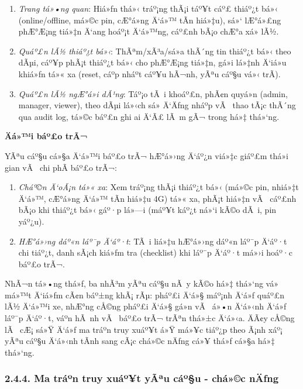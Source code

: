 \documentclass[a4paper]{extarticle}
\providecommand{\tightlist}{%
  \setlength{\itemsep}{0pt}\setlength{\parskip}{0pt}}
\begin{document}
\begin{enumerate}
\def\labelenumi{\arabic{enumi}.}
\tightlist
\item
  \emph{Trang tá»•ng quan}: Hiá»ƒn thá»‹ tráº¡ng thÃ¡i táº¥t cáº£ thiáº¿t bá»‹
  (online/offline, má»©c pin, cÆ°á»ng Ä‘á»™ tÃ­n hiá»‡u), sá»‘ lÆ°á»£ng phÆ°Æ¡ng tiá»‡n
  Ä‘ang hoáº¡t Ä‘á»™ng, cáº£nh bÃ¡o chÆ°a xá»­ lÃ½.
\item
  \emph{Quáº£n lÃ½ thiáº¿t bá»‹}: ThÃªm/xÃ³a/sá»­a thÃ´ng tin thiáº¿t bá»‹ theo dÃµi, cáº¥p
  phÃ¡t thiáº¿t bá»‹ cho phÆ°Æ¡ng tiá»‡n, gá»­i lá»‡nh Ä‘iá»u khiá»ƒn tá»« xa (reset, cáº­p
  nháº­t cáº¥u hÃ¬nh, yÃªu cáº§u vá»‹ trÃ­).
\item
  \emph{Quáº£n lÃ½ ngÆ°á»i dÃ¹ng}: Táº¡o tÃ i khoáº£n, phÃ¢n quyá»n (admin, manager,
  viewer), theo dÃµi lá»‹ch sá»­ Ä‘Äƒng nháº­p vÃ  thao tÃ¡c thÃ´ng qua audit log,
  tá»©c báº£n ghi ai Ä‘Ã£ lÃ m gÃ¬ trong há»‡ thá»‘ng.
\end{enumerate}

\textbf{Äá»™i báº£o trÃ¬}

YÃªu cáº§u cá»§a Ä‘á»™i báº£o trÃ¬ hÆ°á»›ng Ä‘áº¿n viá»‡c giáº£m thá»i gian vÃ  chi phÃ­ báº£o
trÃ¬:

\begin{enumerate}
\def\labelenumi{\arabic{enumi}.}
\tightlist
\item
  \emph{Cháº©n Ä‘oÃ¡n tá»« xa}: Xem tráº¡ng thÃ¡i thiáº¿t bá»‹ (má»©c pin, nhiá»‡t Ä‘á»™,
  cÆ°á»ng Ä‘á»™ tÃ­n hiá»‡u 4G) tá»« xa, phÃ¡t hiá»‡n vÃ  cáº£nh bÃ¡o khi thiáº¿t bá»‹ gáº·p
  lá»—i (máº¥t káº¿t ná»‘i kÃ©o dÃ i, pin yáº¿u).
\item
  \emph{HÆ°á»›ng dáº«n láº¯p Ä‘áº·t}: TÃ i liá»‡u hÆ°á»›ng dáº«n láº¯p Ä‘áº·t chi tiáº¿t, danh
  sÃ¡ch kiá»ƒm tra (checklist) khi láº¯p Ä‘áº·t má»›i hoáº·c báº£o trÃ¬.
\end{enumerate}

NhÃ¬n tá»•ng thá»ƒ, ba nhÃ³m yÃªu cáº§u nÃ y kÃ©o há»‡ thá»‘ng vá» má»™t Ä‘iá»ƒm cÃ¢n báº±ng khÃ¡
rÃµ: pháº£i Ä‘á»§ máº¡nh Ä‘á»ƒ quáº£n lÃ½ Ä‘á»™i xe, nhÆ°ng cÅ©ng pháº£i Ä‘á»§ gá»n vÃ  á»•n Ä‘á»‹nh Ä‘á»ƒ
láº¯p Ä‘áº·t, váº­n hÃ nh vÃ  báº£o trÃ¬ trÃªn thá»±c Ä‘á»‹a. ÄÃ¢y cÅ©ng lÃ  cÆ¡ sá»Ÿ Ä‘á»ƒ ma tráº­n
truy xuáº¥t á»Ÿ má»¥c tiáº¿p theo Ã¡nh xáº¡ yÃªu cáº§u Ä‘á»‹nh tÃ­nh sang cÃ¡c chá»©c nÄƒng cá»¥
thá»ƒ cá»§a há»‡ thá»‘ng.

\subsubsection{2.4.4. Ma tráº­n truy xuáº¥t yÃªu cáº§u - chá»©c
nÄƒng}\label{244-ma-trux1eadn-truy-xuux1ea5t-yuxeau-cux1ea7u---chux1ee9c-nux103ng}
\end{document}
